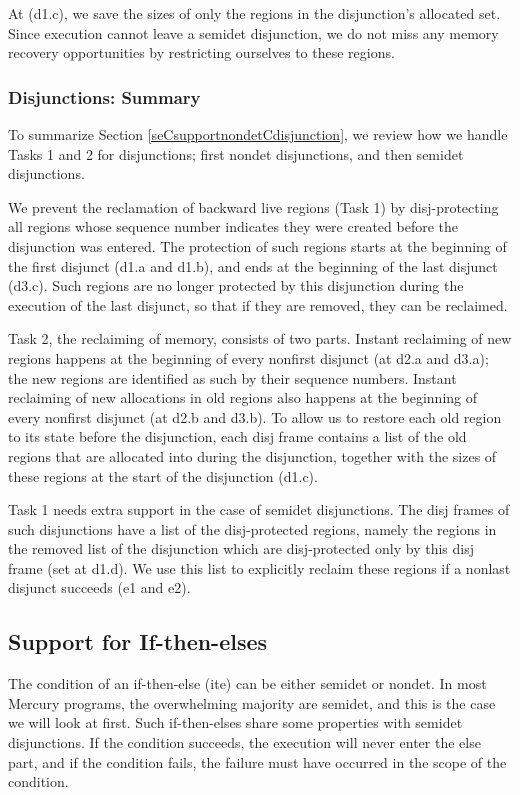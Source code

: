 \documentclass{tlp}
\begin{document}
At (d1.c), we save the sizes
of only the regions in the disjunction's allocated set.
Since execution cannot leave a semidet disjunction,
we do not miss any memory recovery opportunities
by restricting ourselves to these regions.

\subsubsection{Disjunctions: Summary}
To summarize Section \ref{seCsupportnondetCdisjunction},
we review how we handle Tasks 1 and 2 for disjunctions;
first nondet disjunctions, and then semidet disjunctions.

We prevent the reclamation of backward live regions (Task 1)
by disj-protecting all regions whose sequence number indicates
they were created before the disjunction was entered.
The protection of such regions
starts at the beginning of the first disjunct (d1.a and d1.b),
and ends at the beginning of the last disjunct (d3.c).
Such regions are no longer protected by this disjunction
during the execution of the last disjunct,
so that if they are removed, they can be reclaimed.

Task 2, the reclaiming of memory, consists of two parts.
Instant reclaiming of new regions happens
at the beginning of every nonfirst disjunct (at d2.a and d3.a);
the new regions are identified as such by their sequence numbers.
Instant reclaiming of new allocations in old regions
also happens at the beginning of every nonfirst disjunct (at d2.b and d3.b).
To allow us to restore each old region to its state before the disjunction,
each disj frame contains a list
of the old regions that are allocated into during the disjunction,
together with the sizes of these regions
at the start of the disjunction (d1.c).

Task 1 needs extra support in the case of semidet disjunctions.
The disj frames of such disjunctions have a list of the disj-protected regions,
namely the regions in the removed list of the disjunction
which are disj-protected only by this disj frame (set at d1.d).
We use this list to explicitly reclaim these regions
if a nonlast disjunct succeeds (e1 and e2).

\subsection{Support for If-then-elses}
\label{seCsupportnondetCite}

The condition of an if-then-else (ite) can be either semidet or nondet.
In most Mercury programs, the overwhelming majority are semidet,
and this is the case we will look at first.
Such if-then-elses share some properties with semidet disjunctions.
If the condition succeeds, the execution will never enter the else part,
and if the condition fails,
the failure must have occurred in the scope of the condition.
\end{document}
